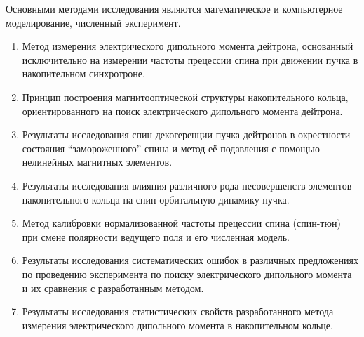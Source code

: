 {\methods} Основными методами исследования являются математическое и компьютерное моделирование,
численный эксперимент.

{}
\begin{enumerate}
	\item Метод измерения электрического дипольного момента дейтрона, основанный исключительно на измерении частоты прецессии спина при движении пучка в накопительном синхротроне.
	\item Принцип построения магнитооптической структуры накопительного кольца, ориентированного на поиск электрического дипольного момента дейтрона.
	\item Результаты исследования спин-декогеренции пучка дейтронов в окрестности состояния ``замороженного'' спина и метод её подавления с помощью нелинейных магнитных элементов.
	\item Результаты исследования влияния различного рода несовершенств элементов накопительного кольца 
	на спин-орбитальную динамику пучка. 
	\item Метод калибровки нормализованной частоты прецессии спина (спин-тюн) при смене полярности ведущего поля и его численная модель.
	\item Результаты исследования систематических ошибок в различных предложениях по проведению эксперимента по поиску электрического дипольного момента и их сравнения с разработанным методом. 
	\item Результаты исследования статистических свойств разработанного метода измерения электрического дипольного момента	в накопительном кольце.

\end{enumerate}
